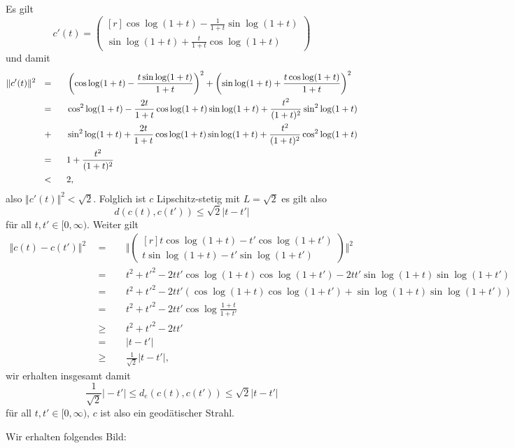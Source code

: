 \documentclass[11pt]{book}
\numberwithin{dummy}{section}
\theoremstyle{nonumberbreak}
\newenvironment{prob}[1][]{\ifthenelse{\equal{#1}{}}{\problem}{\problem[#1]}\rm}{\endproblem}
\newenvironment{sol}[1][]{\ifthenelse{\equal{#1}{}}{\solution}{\solution[#1]}\rm}{\endsolution}
\begin{document}
\begin{spacing}{1.4}
\begin{prob}
\begin{sol}
\begin{compactenum}
\item Es gilt 
$$c'(t)=\begin{pmatrix}[r] \cos \log(1+t) - \frac{1}{1+t} \sin \log(1+t) \\ \sin \log(1+t) + \frac{t}{1+t} \cos \log(1+t) \end{pmatrix}$$
und damit
\begin{alignat*}{5}
\Vert c'(t)\Vert^2 \ \ &=&& \ \ \left( \cos \log(1+t) - \frac{t\sin \log(1+t)}{1+t} \right)^2 + \left( \sin \log(1+t) + \frac{t\cos \log(1+t)}{1+t}\right)^2 \\
&=&& \ \ \cos^2 \log(1+t) - \frac{2t}{1+t}\cos \log(1+t) \sin \log(1+t) + \frac{t^2}{(1+t)^2} \sin^2 \log(1+t) \\
&\hspace{2.8pt}+&& \ \ \sin^2 \log(1+t) + \frac{2t}{1+t} \cos \log(1+t)\sin\log(1+t) + \frac{t^2}{(1+t)^2} \cos^2\log(1+t) \\
&=&& \ \ 1+ \frac{t^2}{(1+t)^2}\\
&<&& \ \ 2,
\end{alignat*}
also $\Vert c'(t)\Vert^2 <\sqrt{2}$. Folglich ist $c$ Lipschitz-stetig mit $L=\sqrt{2}$ es gilt also 
$$d(c(t), c(t')) \leqslant \sqrt{2} \vert t-t'\vert$$
für all $t,t' \in [0,\infty)$. Weiter gilt
\begin{alignat*}{5}
\Vert c(t)-c(t')\Vert^2 \ \ &=&& \ \ \Bigg\Vert \begin{pmatrix}[r] t \cos \log(1+t) - t' \cos \log(1+t') \\ t \sin \log(1+t) - t' \sin \log(1+t') \end{pmatrix} \Bigg \Vert^2 \\
&=&& \ \ t^2 + t'^2 - 2tt'\cos \log(1+t) \cos \log(1+t') -2tt' \sin \log(1+t) \sin \log(1+t') \\
&=&& \ \ t^2+t'^2 -2tt' \left( \cos \log(1+t) \cos \log(1+t') + \sin \log(1+t) \sin \log(1+t') \right) \\
&=&& \ \ t^2+t'^2 - 2tt' \cos \log \frac{1+t}{1+t'} \\
&\geqslant&& \ \ t^2+t'^2 - 2tt' \\
&=&& \ \ \vert t-t'\vert \\
&\geqslant&& \ \ \frac{1}{\sqrt{2}} \vert t-t'\vert,
\end{alignat*}
wir erhalten insgesamt damit
$$\frac{1}{\sqrt{2}} \vert -t'\vert \leqslant d_e(c(t),c(t')) \leqslant \sqrt{2} \vert t-t'\vert$$
für all $t,t' \in [0,\infty)$, $c$ ist also ein geodätischer Strahl.

\item Wir erhalten folgendes Bild:


\end{compactenum}
\end{sol}
\end{prob}
\end{spacing}
\end{document}
